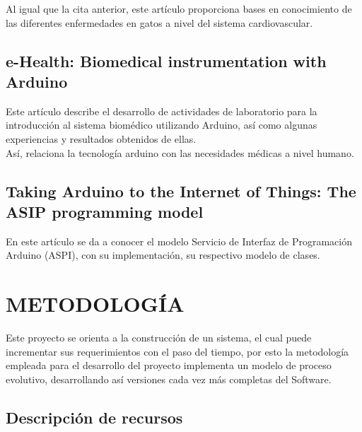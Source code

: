 \documentclass[letterpaper, 10 pt, conference]{ieeeconf}  %
\begin{document}
Al igual que la cita anterior, este art\'iculo proporciona bases en conocimiento de las diferentes enfermedades en gatos a nivel del sistema cardiovascular.

\subsection{e-Health: Biomedical instrumentation with Arduino \cite{c5}}

Este art\'iculo describe  el desarrollo de actividades de laboratorio para la introducci\'on al sistema biom\'edico utilizando Arduino, as\'i como algunas experiencias y resultados obtenidos de ellas.\\

As\'i, relaciona la tecnolog\'ia arduino con las necesidades m\'edicas a nivel humano.


\subsection{Taking Arduino to the Internet of Things: The ASIP programming model \cite{c6}}

En este art\'iculo se da a conocer el modelo Servicio de Interfaz de Programaci\'on Arduino (ASPI), con su implementaci\'on, su respectivo modelo de clases.





\section{METODOLOG\'IA}

Este proyecto se orienta a la construcci\'on de un sistema, el cual puede incrementar sus requerimientos con el paso del tiempo, por esto la metodolog\'ia empleada para el desarrollo del proyecto implementa un modelo de proceso evolutivo, desarrollando as\'i versiones cada vez m\'as completas del Software.\\

\subsection{Descripci\'on de recursos}
\end{document}
